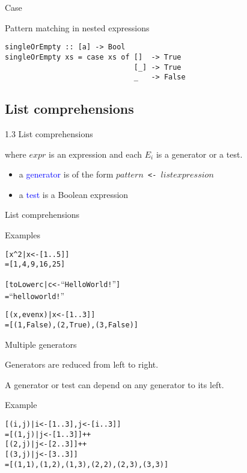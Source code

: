 \documentclass{beamer}
\def\code#1{\texttt{\frenchspacing#1}}
\begin{document}
\begin{frame}[fragile]{Case}

Pattern matching in nested expressions

\begin{verbatim}
singleOrEmpty :: [a] -> Bool
singleOrEmpty xs = case xs of []  -> True
                              [_] -> True
                              _   -> False
\end{verbatim}

\end{frame}

\subsection{List comprehensions}

\begin{frame}{1.3 List comprehensions}

\begin{block}{\centering \code{[ $expr$ | $E_1$, ..., $E_n$ ]}}
\end{block}

where $expr$ is an expression and each $E_i$ is a generator or a test.

\begin{itemize}
    \item a \textcolor{blue}{generator} is of the form \code{$pattern$ <- $list expression$}
    \item a \textcolor{blue}{test} is a Boolean expression
\end{itemize}

\end{frame}

\begin{frame}[fragile]{List comprehensions}

\begin{exampleblock}{Examples}
\begin{alltt}
[ x ^ 2 | x <- [1..5]]\pause
= [1, 4, 9, 16, 25]

[ toLower c | c <- “Hello World!”]\pause
= “hello world!”

[ (x, even x) | x <- [1..3]]\pause
= [(1, False), (2, True), (3, False)]
\end{alltt}
\end{exampleblock}

\end{frame}

\begin{frame}[fragile]{Multiple generators}

Generators are reduced from left to right. \par
A generator or test can depend on any generator to its left.

\pause

\begin{exampleblock}{Example}
\begin{alltt}
[(i,j) | i <- [1 .. 3], j <- [i .. 3]]\pause
= [(1,j) | j <- [1..3]] ++
  [(2,j) | j <- [2..3]] ++
  [(3,j) | j <- [3..3]]\pause
= [(1,1), (1,2), (1,3), (2,2), (2,3), (3,3)]
\end{alltt}
\end{exampleblock}

\end{frame}
\end{document}
